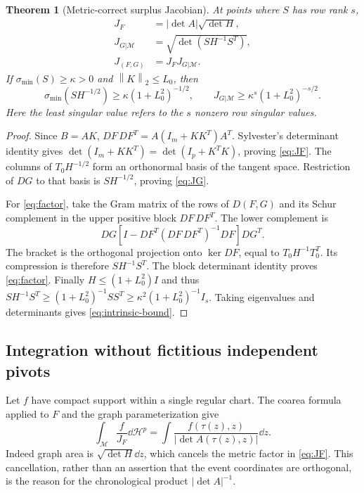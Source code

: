 \documentclass[11pt,reqno]{amsart}
\numberwithin{equation}{section}
\newtheorem{theorem}{Theorem}[section]
\theoremstyle{remark}\newtheorem{remark}[theorem]{Remark}
\newcommand{\norm}[1]{\left\lVert #1\right\rVert}
\begin{document}
\begin{theorem}[Metric-correct surplus Jacobian]\label{thm:coarea}
At points where $S$ has row rank $s$,
\begin{align}
 J_F&=|\det A|\sqrt{\det H},\label{eq:JF}\\
 J_{G|\mathcal M}&=\sqrt{\det(SH^{-1}S^T)},\label{eq:JG}\\
 J_{(F,G)}&=J_FJ_{G|\mathcal M}.\label{eq:factor}
\end{align}
If $\sigma_{\min}(S)\ge\kappa>0$ and $\norm K_2\le L_0$, then
\begin{equation}\label{eq:intrinsic-bound}
 \sigma_{\min}(SH^{-1/2})\ge\kappa(1+L_0^2)^{-1/2},
 \qquad J_{G|\mathcal M}\ge\kappa^s(1+L_0^2)^{-s/2}.
\end{equation}
Here the least singular value refers to the $s$ nonzero row singular values.
\end{theorem}
\begin{proof}
Since $B=AK$, $DF\,DF^T=A(I_m+KK^T)A^T$. Sylvester's determinant identity gives $\det(I_m+KK^T)=\det(I_p+K^TK)$, proving \eqref{eq:JF}. The columns of $T_0H^{-1/2}$ form an orthonormal basis of the tangent space. Restriction of $DG$ to that basis is $SH^{-1/2}$, proving \eqref{eq:JG}.

For \eqref{eq:factor}, take the Gram matrix of the rows of $D(F,G)$ and its Schur complement in the upper positive block $DF\,DF^T$. The lower complement is
\[
 DG\left[I-DF^T(DF\,DF^T)^{-1}DF\right]DG^T.
\]
The bracket is the orthogonal projection onto $\ker DF$, equal to $T_0H^{-1}T_0^T$. Its compression is therefore $SH^{-1}S^T$. The block determinant identity proves \eqref{eq:factor}. Finally $H\le(1+L_0^2)I$ and thus
$SH^{-1}S^T\ge(1+L_0^2)^{-1}SS^T\ge\kappa^2(1+L_0^2)^{-1}I_s$.
Taking eigenvalues and determinants gives \eqref{eq:intrinsic-bound}.
\end{proof}

\subsection{Integration without fictitious independent pivots}
Let $f$ have compact support within a single regular chart. The coarea formula applied to $F$ and the graph parameterization give
\begin{equation}\label{eq:graph-measure}
 \int_{\mathcal M}\frac{f}{J_F}\dd\mathcal H^p
 =\int\frac{f(\tau(z),z)}{|\det A(\tau(z),z)|}\dd z.
\end{equation}
Indeed graph area is $\sqrt{\det H}\dd z$, which cancels the metric factor in \eqref{eq:JF}. This cancellation, rather than an assertion that the event coordinates are orthogonal, is the reason for the chronological product $|\det A|^{-1}$.
\end{document}
